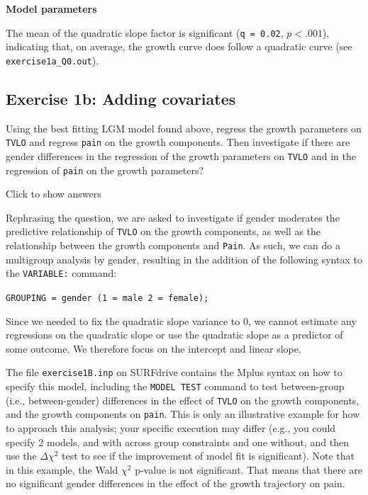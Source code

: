 \documentclass[
]{book}
\begin{document}
\textbf{Model parameters}

The mean of the quadratic slope factor is significant (\texttt{q\ =\ 0.02}, \(p < .001\)), indicating that, on average, the growth curve does follow a quadratic curve (see \texttt{exercise1a\_Q0.out}).

\hypertarget{exercise-1b-adding-covariates}{%
\subsection{Exercise 1b: Adding covariates}\label{exercise-1b-adding-covariates}}

Using the best fitting LGM model found above, regress the growth parameters on \texttt{TVLO} and regress \texttt{pain} on the growth components. Then investigate if there are gender differences in the regression of the growth parameters on \texttt{TVLO} and in the regression of \texttt{pain} on the growth parameters?

Click to show answers

Rephrasing the question, we are asked to investigate if gender moderates the predictive relationship of \texttt{TVLO} on the growth components, as well as the relationship between the growth components and \texttt{Pain}. As such, we can do a multigroup analysis by gender, resulting in the addition of the following syntax to the \texttt{VARIABLE:} command:

\texttt{GROUPING\ =\ gender\ (1\ =\ male\ 2\ =\ female);}

Since we needed to fix the quadratic slope variance to 0, we cannot estimate any regressions on the quadratic slope or use the quadratic slope as a predictor of some outcome. We therefore focus on the intercept and linear slope.

The file \texttt{exercise1B.inp} on SURFdrive contains the Mplus syntax on how to specify this model, including the \texttt{MODEL\ TEST} command to test between-group (i.e., between-gender) differences in the effect of \texttt{TVLO} on the growth components, and the growth components on \texttt{pain}. This is only an illustrative example for how to approach this analysis; your specific execution may differ (e.g., you could specify 2 models, and with across group constraints and one without, and then use the \(\Delta \chi^{2}\) test to see if the improvement of model fit is significant). Note that in this example, the Wald \(\chi^2\) p-value is not significant. That means that there are no significant gender differences in the effect of the growth trajectory on pain.
\end{document}

